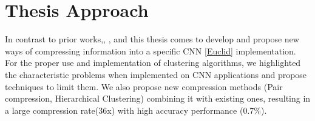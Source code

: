 \section{Thesis Approach}
In contrast to  prior  works,\cite{Reference23},  \cite{Reference24}, \cite{Reference27} and \cite{Reference25} this thesis comes to develop and propose new ways of compressing information into a specific CNN \ref{Euclid} implementation. For the proper use and implementation of clustering algorithms, we highlighted the characteristic problems when implemented on CNN applications and propose techniques to limit them. We also propose new compression methods (Pair compression, Hierarchical Clustering)  combining it with existing ones, resulting in a large compression rate(36x) with high accuracy performance (0.7\%).


 